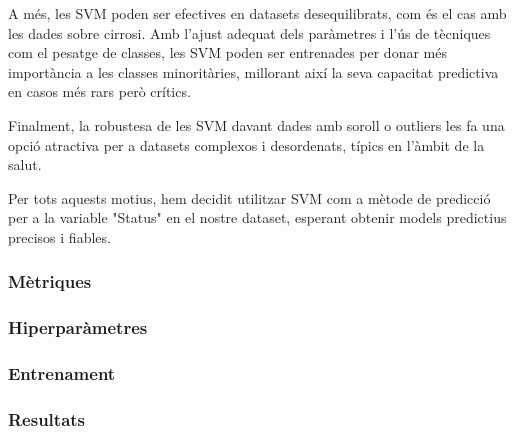A més, les SVM poden ser efectives en datasets desequilibrats, com és el cas amb les dades sobre cirrosi. Amb l'ajust adequat dels paràmetres i l'ús de tècniques com el pesatge de classes, les SVM poden ser entrenades per donar més importància a les classes minoritàries, millorant així la seva capacitat predictiva en casos més rars però crítics.

Finalment, la robustesa de les SVM davant dades amb soroll o outliers les fa una opció atractiva per a datasets complexos i desordenats, típics en l'àmbit de la salut.

Per tots aquests motius, hem decidit utilitzar SVM com a mètode de predicció per a la variable "Status" en el nostre dataset, esperant obtenir models predictius precisos i fiables.
\subsubsection{Mètriques}

\subsubsection{Hiperparàmetres}

\subsubsection{Entrenament}

\subsubsection{Resultats}

